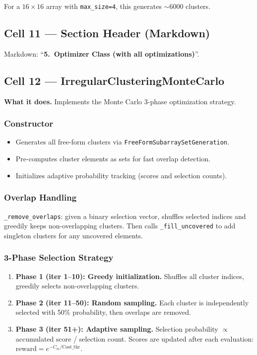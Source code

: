 \documentclass[11pt,a4paper]{article}
\begin{document}
For a $16 \times 16$ array with \texttt{max\_size=4}, this generates $\sim$6000 clusters.

\subsection{Cell 11 --- Section Header (Markdown)}
Markdown: ``\textbf{5.\ Optimizer Class (with all optimizations)}''.

\subsection{Cell 12 --- IrregularClusteringMonteCarlo}
\label{sec:cell12}

\textbf{What it does.}
Implements the Monte Carlo 3-phase optimization strategy.

\subsubsection{Constructor}
\begin{itemize}
    \item Generates all free-form clusters via \texttt{FreeFormSubarraySetGeneration}.
    \item Pre-computes cluster elements as sets for fast overlap detection.
    \item Initializes adaptive probability tracking (scores and selection counts).
\end{itemize}

\subsubsection{Overlap Handling}
\texttt{\_remove\_overlaps}: given a binary selection vector, shuffles selected indices
and greedily keeps non-overlapping clusters. Then calls \texttt{\_fill\_uncovered}
to add singleton clusters for any uncovered elements.

\subsubsection{3-Phase Selection Strategy}
\begin{enumerate}
    \item \textbf{Phase 1 (iter 1--10): Greedy initialization.}
          Shuffles all cluster indices, greedily selects non-overlapping clusters.
    \item \textbf{Phase 2 (iter 11--50): Random sampling.}
          Each cluster is independently selected with 50\% probability, then overlaps
          are removed.
    \item \textbf{Phase 3 (iter 51+): Adaptive sampling.}
          Selection probability $\propto$ accumulated score / selection count.
          Scores are updated after each evaluation: $\text{reward} = e^{-C_m / \text{Cost\_thr}}$.
\end{enumerate}
\end{document}
